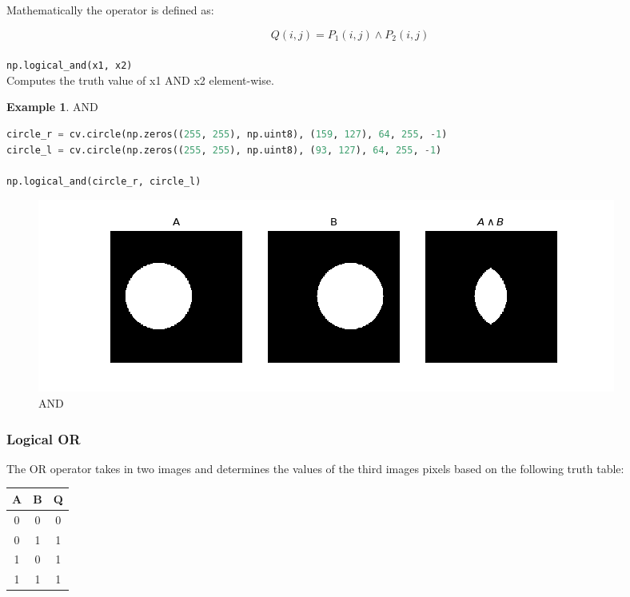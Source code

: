\documentclass{article}
\theoremstyle{definition}
\newtheorem{ex}{Example}[subsection]
\theoremstyle{remark}
\newcommand{\func}[2]{\noindent\lstinline{#1}\\#2}
\begin{document}
\noindent Mathematically the operator is defined as:

\begin{equation}
    Q(i,j) = P_1(i, j) \land P_2(i, j) 
\end{equation} \\

\func{np.logical_and(x1, x2)}{Computes the truth value of x1 AND x2 element-wise.}

\begin{ex} AND
\begin{lstlisting}[language=Python]
circle_r = cv.circle(np.zeros((255, 255), np.uint8), (159, 127), 64, 255, -1)
circle_l = cv.circle(np.zeros((255, 255), np.uint8), (93, 127), 64, 255, -1)

np.logical_and(circle_r, circle_l)
\end{lstlisting}
\begin{figure}[H]
    \centering
    \includegraphics[width=\textwidth]{ocv_AND}
    \caption{AND}
    \label{fig:ocv_and}
\end{figure}
\end{ex}

\subsubsection{Logical OR}

The OR operator takes in two images and determines the values of the third images pixels based on the following truth table:

\begin{table}[H]
    \centering
    \def\arraystretch{1.1}%
    \begin{tabular}{ c c c } 
	\hline
	A & B & Q \\
	\hline
	0 & 0 & 0 \\
	0 & 1 & 1 \\
	1 & 0 & 1 \\
	1 & 1 & 1 \\
	\hline
    \end{tabular}
\end{table}
\end{document}
